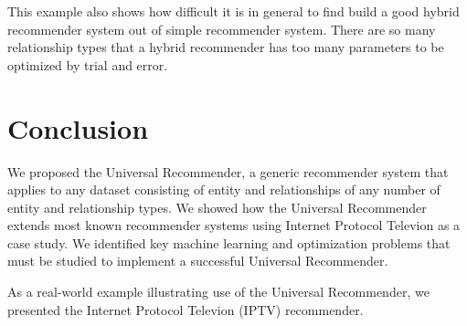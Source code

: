 \documentclass{article}
\begin{document}
This example also shows how difficult it is in general to find build a
good hybrid recommender system out of simple recommender system.  There
are so many relationship types that a hybrid recommender has too many
parameters to be optimized by trial and error. 

\section{Conclusion}
We proposed the Universal Recommender, a generic recommender system that
applies to any dataset consisting of entity and relationships of any
number of entity and relationship types.  
We showed how the Universal Recommender extends most known recommender
systems using Internet Protocol Televion as a case study.
We identified key machine learning and optimization problems that must be
studied to implement a successful Universal Recommender. 

As a real-world example illustrating use of the Universal Recommender,
we presented the Internet Protocol Televion (IPTV) recommender. 



\end{document}
